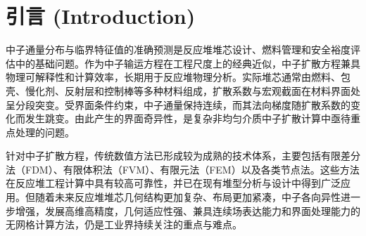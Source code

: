 \documentclass[final,3p,times,sort&compress]{elsarticle}
\begin{document}

\section{引言 (Introduction)} 
\label{sec:introduction}

中子通量分布与临界特征值的准确预测是反应堆堆芯设计、燃料管理和安全裕度评估中的基础问题。作为中子输运方程在工程尺度上的经典近似，中子扩散方程兼具物理可解释性和计算效率，长期用于反应堆物理分析\cite{stacey2018nuclear, XieZhongSheng2020HeFanYing}。实际堆芯通常由燃料、包壳、慢化剂、反射层和控制棒等多种材料组成，扩散系数与宏观截面在材料界面处呈分段突变。受界面条件约束，中子通量保持连续，而其法向梯度随扩散系数的变化而发生跳变。由此产生的界面奇异性，是复杂非均匀介质中子扩散计算中亟待重点处理的问题。

{\color{black}
针对中子扩散方程，传统数值方法已形成较为成熟的技术体系，主要包括有限差分法（FDM）\cite{zhu2016optimally, mohamedhamada2022higher}、有限体积法（FVM）\cite{li2024research}、有限元法（FEM）\cite{chunyu2018fast, zong2023multithreaded}以及各类节点法\cite{wang2010improved, yin2024efficient, zhuang2021variational}。这些方法在反应堆工程计算中具有较高可靠性，并已在现有堆型分析与设计中得到广泛应用。但随着未来反应堆堆芯几何结构更加复杂、布局更加紧凑，中子各向异性进一步增强，发展高维高精度，几何适应性强、兼具连续场表达能力和界面处理能力的无网格计算方法，仍是工业界持续关注的重点与难点。}
\end{document}
